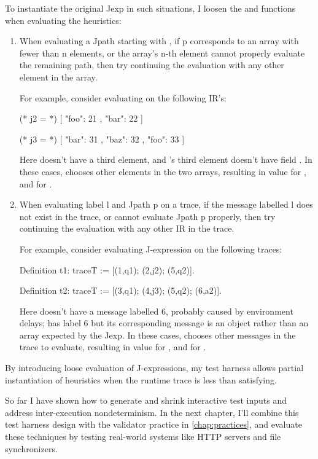 To instantiate the original Jexp in such situations, I loosen the
 and  functions when evaluating the heuristics:
\begin{enumerate}
\item When evaluating a Jpath starting with , if \ilj p corresponds to
  an array with fewer than \ilj n elements, or the array's \ilj n-th element
  cannot properly evaluate the remaining path, then try continuing the
  evaluation with any other element in the array.

  For example, consider evaluating  on the following IR's:
  \begin{multicols}{2}
\begin{json}
  (* j2 = *)
  [
    { "foo": 21 },
    { "bar": 22 }
  ]
\end{json}
\columnbreak
\begin{json}
  (* j3 = *)
  [
    { "bar": 31 },
    { "baz": 32 },
    { "foo": 33 }
  ]
\end{json}
  \end{multicols}

  Here  doesn't have a third element, and 's third element
  doesn't have field .  In these cases,  chooses other
  elements in the two arrays, resulting in value  for , and
   for .
  
\item When evaluating label \ilj l and Jpath \ilj p on a trace, if the message
  labelled \ilj l does not exist in the trace, or cannot evaluate Jpath \ilj p
  properly, then try continuing the evaluation with any other IR in the trace.

  For example, consider evaluating J-expression  on the
  following traces:
\begin{coq}
  Definition t1: traceT :=
    [(1,q1); (2,j2); (5,q2)].

  Definition t2: traceT :=
    [(3,q1); (4,j3); (5,q2); (6,a2)].
\end{coq}

Here  doesn't have a message labelled 6, probably caused by environment
delays;  has label 6 but its corresponding message is an object rather
than an array expected by the Jexp.  In these cases,  chooses other
messages in the trace to evaluate, resulting in value  for , and
 for .
\end{enumerate}

By introducing loose evaluation of J-expressions, my test harness allows partial
instantiation of heuristics when the runtime trace is less than satisfying.

So far I have shown how to generate and shrink interactive test inputs and
address inter-execution nondeterminism.  In the next chapter, I'll combine this
test harness design with the validator practice in \autoref{chap:practices}, and
evaluate these techniques by testing real-world systems like HTTP servers and
file synchronizers.

